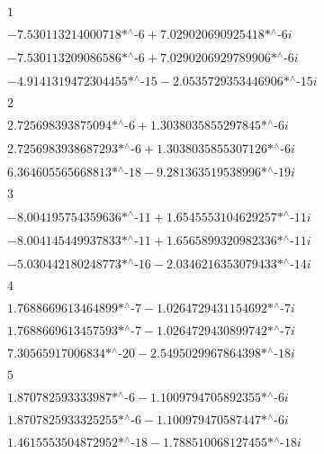 \noindent\(1\)

\noindent\(-\text{7.530113214000718$\grave{ }$*${}^{\wedge}$-6}+\text{7.029020690925418$\grave{ }$*${}^{\wedge}$-6} i\)

\noindent\(-\text{7.530113209086586$\grave{ }$*${}^{\wedge}$-6}+\text{7.0290206929789906$\grave{ }$*${}^{\wedge}$-6} i\)

\noindent\(-\text{4.9141319472304455$\grave{ }$*${}^{\wedge}$-15}-\text{2.0535729353446906$\grave{ }$*${}^{\wedge}$-15} i\)

\noindent\(2\)

\noindent\(\text{2.725698393875094$\grave{ }$*${}^{\wedge}$-6}+\text{1.3038035855297845$\grave{ }$*${}^{\wedge}$-6} i\)

\noindent\(\text{2.7256983938687293$\grave{ }$*${}^{\wedge}$-6}+\text{1.3038035855307126$\grave{ }$*${}^{\wedge}$-6} i\)

\noindent\(\text{6.364605565668813$\grave{ }$*${}^{\wedge}$-18}-\text{9.281363519538996$\grave{ }$*${}^{\wedge}$-19} i\)

\noindent\(3\)

\noindent\(-\text{8.004195754359636$\grave{ }$*${}^{\wedge}$-11}+\text{1.6545553104629257$\grave{ }$*${}^{\wedge}$-11} i\)

\noindent\(-\text{8.004145449937833$\grave{ }$*${}^{\wedge}$-11}+\text{1.6565899320982336$\grave{ }$*${}^{\wedge}$-11} i\)

\noindent\(-\text{5.030442180248773$\grave{ }$*${}^{\wedge}$-16}-\text{2.0346216353079433$\grave{ }$*${}^{\wedge}$-14} i\)

\noindent\(4\)

\noindent\(\text{1.7688669613464899$\grave{ }$*${}^{\wedge}$-7}-\text{1.0264729431154692$\grave{ }$*${}^{\wedge}$-7} i\)

\noindent\(\text{1.7688669613457593$\grave{ }$*${}^{\wedge}$-7}-\text{1.0264729430899742$\grave{ }$*${}^{\wedge}$-7} i\)

\noindent\(\text{7.30565917006834$\grave{ }$*${}^{\wedge}$-20}-\text{2.5495029967864398$\grave{ }$*${}^{\wedge}$-18} i\)

\noindent\(5\)

\noindent\(\text{1.870782593333987$\grave{ }$*${}^{\wedge}$-6}-\text{1.1009794705892355$\grave{ }$*${}^{\wedge}$-6} i\)

\noindent\(\text{1.8707825933325255$\grave{ }$*${}^{\wedge}$-6}-\text{1.100979470587447$\grave{ }$*${}^{\wedge}$-6} i\)

\noindent\(\text{1.4615553504872952$\grave{ }$*${}^{\wedge}$-18}-\text{1.788510068127455$\grave{ }$*${}^{\wedge}$-18} i\)

